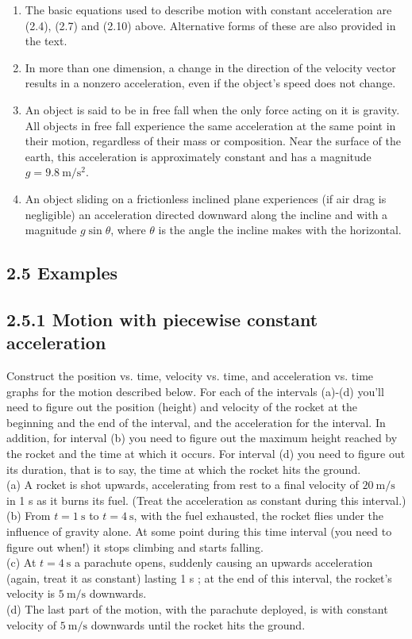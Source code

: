 \documentclass[10pt]{article}
\begin{document}
\begin{enumerate}
  \item The basic equations used to describe motion with constant acceleration are (2.4), (2.7) and (2.10) above. Alternative forms of these are also provided in the text.
  \item In more than one dimension, a change in the direction of the velocity vector results in a nonzero acceleration, even if the object's speed does not change.
  \item An object is said to be in free fall when the only force acting on it is gravity. All objects in free fall experience the same acceleration at the same point in their motion, regardless of their mass or composition. Near the surface of the earth, this acceleration is approximately constant and has a magnitude $g=9.8 \mathrm{~m} / \mathrm{s}^{2}$.
  \item An object sliding on a frictionless inclined plane experiences (if air drag is negligible) an acceleration directed downward along the incline and with a magnitude $g \sin \theta$, where $\theta$ is the angle the incline makes with the horizontal.
\end{enumerate}

\subsection*{2.5 Examples}
\subsection*{2.5.1 Motion with piecewise constant acceleration}
Construct the position vs. time, velocity vs. time, and acceleration vs. time graphs for the motion described below. For each of the intervals (a)-(d) you'll need to figure out the position (height) and velocity of the rocket at the beginning and the end of the interval, and the acceleration for the interval. In addition, for interval (b) you need to figure out the maximum height reached by the rocket and the time at which it occurs. For interval (d) you need to figure out its duration, that is to say, the time at which the rocket hits the ground.\\
(a) A rocket is shot upwards, accelerating from rest to a final velocity of $20 \mathrm{~m} / \mathrm{s}$ in 1 s as it burns its fuel. (Treat the acceleration as constant during this interval.)\\
(b) From $t=1 \mathrm{~s}$ to $t=4 \mathrm{~s}$, with the fuel exhausted, the rocket flies under the influence of gravity alone. At some point during this time interval (you need to figure out when!) it stops climbing and starts falling.\\
(c) At $t=4 \mathrm{~s}$ a parachute opens, suddenly causing an upwards acceleration (again, treat it as constant) lasting 1 s ; at the end of this interval, the rocket's velocity is $5 \mathrm{~m} / \mathrm{s}$ downwards.\\
(d) The last part of the motion, with the parachute deployed, is with constant velocity of $5 \mathrm{~m} / \mathrm{s}$ downwards until the rocket hits the ground.
\end{document}
